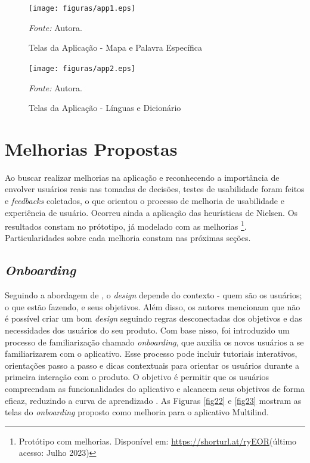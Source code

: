 \begin{figure}[h!]
	\centering
	\caption{Telas da Aplicação - Mapa e Palavra Específica}
	\begin{adjustbox}{center}
		\texttt{[image: figuras/app1.eps]}
	\end{adjustbox}
	\begin{tablenotes}[flushleft]
		\centering
		\item \textit{Fonte:} Autora.
	\end{tablenotes}
	\label{fig18}
\end{figure}

\newpage

\begin{figure}[h!]
	\centering
	\caption{Telas da Aplicação - Línguas e Dicionário}
	\begin{adjustbox}{center}
		\texttt{[image: figuras/app2.eps]}
	\end{adjustbox}
	\begin{tablenotes}[flushleft]
		\centering
		\item \textit{Fonte:} Autora.
	\end{tablenotes}
	\label{fig19}
\end{figure}

\section{Melhorias Propostas}
\label{sec:Melhorias Propostas}
Ao buscar realizar melhorias na aplicação e reconhecendo a importância de envolver usuários reais nas tomadas de decisões, testes de usabilidade foram feitos e \textit{feedbacks} coletados, 
o que orientou o processo de melhoria de usabilidade e experiência de usuário. Ocorreu ainda a aplicação das heurísticas de Nielsen. Os resultados constam no prótotipo, já modelado com as melhorias
\footnote{Protótipo com melhorias. Disponível em: \url{https://shorturl.at/ryEOR}(último acesso: Julho 2023)}. Particularidades sobre cada melhoria constam nas próximas seções.

\subsection{\textit{Onboarding}}
\label{sec:Onboarding}
Seguindo a abordagem de , o \textit{design} depende do contexto - quem são os usuários; o que estão fazendo, e seus objetivos. Além disso, os autores mencionam que não é possível 
criar um bom \textit{design} seguindo regras desconectadas dos objetivos e das necessidades dos usuários do seu produto. Com base nisso, foi introduzido um processo de familiarização chamado \textit{onboarding}, que 
auxilia os novos usuários a se familiarizarem com o aplicativo. Esse processo pode incluir tutoriais interativos, orientações passo a passo e dicas contextuais para orientar os usuários durante a primeira interação com 
o produto. O objetivo é permitir que os usuários compreendam as funcionalidades do aplicativo e alcancem seus objetivos de forma eficaz, reduzindo a curva de aprendizado \cite{renz2014}. As Figuras \ref{fig22} e \ref{fig23} mostram as 
telas do \textit{onboarding} proposto como melhoria para o aplicativo Multilind.

